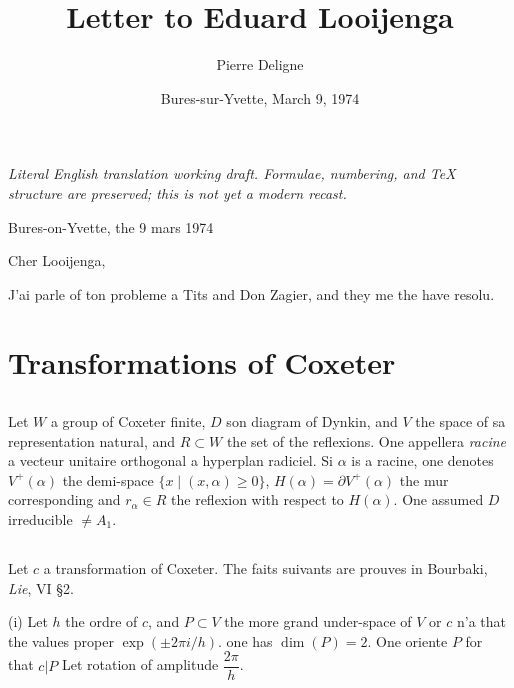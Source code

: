 \documentclass[11pt,a4paper]{article}
\title{Letter to Eduard Looijenga}
\author{Pierre Deligne}
\date{Bures-sur-Yvette, March 9, 1974}
\theoremstyle{plain}
\theoremstyle{definition}
\begin{document}
\begin{center}\small\emph{Literal English translation working draft. Formulae, numbering, and TeX structure are preserved; this is not yet a modern recast.}\end{center}
\vspace{0.5em}


\maketitle

\thispagestyle{empty}

\vspace{-0.5cm}

\noindent
Bures-on-Yvette, the 9 mars 1974

\vspace{0.5cm}

\noindent
Cher Looijenga,

\vspace{0.3cm}

J'ai parle of ton probleme a Tits and Don Zagier, and they me the have resolu.

\section{Transformations of Coxeter}

\subsection{}

Let $W$ a group of Coxeter finite, $D$ son diagram of Dynkin, and $V$ the space of sa representation natural, and $R \subset W$ the set of the reflexions. One appellera \emph{racine} a vecteur unitaire orthogonal a hyperplan radiciel. Si $\alpha$ is a racine, one denotes $V^{+}(\alpha)$ the demi-space $\{x \mid (x,\alpha) \geq 0\}$, $H(\alpha) = \partial V^{+}(\alpha)$ the mur corresponding and $r_{\alpha} \in R$ the reflexion with respect to $H(\alpha)$. One assumed $D$ irreducible $\neq A_1$.

\subsection{}

Let $c$ a transformation of Coxeter. The faits suivants are prouves in Bourbaki, \textit{Lie}, VI \S 2.

\smallskip

\noindent
\textup{(i)} Let $h$ the ordre of $c$, and $P \subset V$ the more grand under-space of $V$ or $c$ n'a that the values proper $\exp(\pm 2\pi i/h)$. one has $\dim(P) = 2$. One oriente $P$ for that $c|P$ Let rotation of amplitude $\dfrac{2\pi}{h}$.
\end{document}
